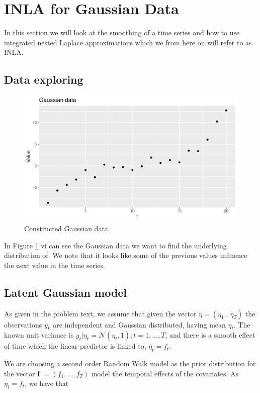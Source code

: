 \section{INLA for Gaussian Data}
In this section we will look at the smoothing of a time series and how to use integrated nested Laplace approximations which we from here on will refer to as INLA.

\subsection{Data exploring}
 
\begin{figure}[h]
    \centering
    \includegraphics[width=\textwidth]{Images/gaussian_data.pdf}
    \caption{Constructed Gaussian data.}
    \label{fig:gaussian_data}
\end{figure}

In Figure \ref{fig:gaussian_data} vi can see the Gaussian data we want to find the underlying distribution of. We note that it looks like some of the previous values influence the next value in the time series. 


\subsection{Latent Gaussian model}

As given in the problem text, we assume that given the vector $\eta = (\eta_1...\eta_T)$ the observations $y_k$ are independent and Gaussian distributed, having mean $\eta_t$. The known unit variance is $y_t|\eta_t = \mathcal{N}(\eta_t, 1); t = 1,...,T$, and there is a smooth effect of time which the linear predictor is linked to, $\eta_t = f_t$. 

We are choosing a second order Random Walk model as the prior distribution for the vector \textbf{f} $= (f_1,...,f_T)$ model the temporal effects of the covariates. As $\eta_t = f_t$, we have that 

